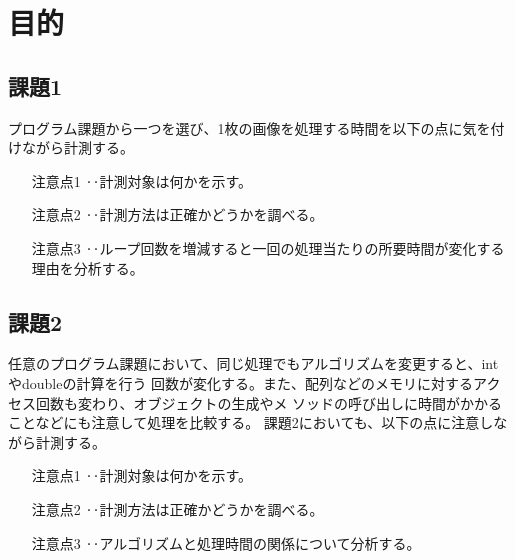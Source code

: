 \section{目的}
\subsection{課題1}
プログラム課題から一つを選び、1枚の画像を処理する時間を以下の点に気を付けながら計測する。
\begin{itemize}
  \setlength{\leftskip}{2.0cm}
  \item[注意点1] ‥計測対象は何かを示す。
  \item[注意点2] ‥計測方法は正確かどうかを調べる。
  \item[注意点3] ‥ループ回数を増減すると一回の処理当たりの所要時間が変化する理由を分析する。
\end{itemize}

\subsection{課題2}
任意のプログラム課題において、同じ処理でもアルゴリズムを変更すると、intやdoubleの計算を行う
回数が変化する。また、配列などのメモリに対するアクセス回数も変わり、オブジェクトの生成やメ
ソッドの呼び出しに時間がかかることなどにも注意して処理を比較する。
課題2においても、以下の点に注意しながら計測する。
\begin{itemize}
  \setlength{\leftskip}{2.0cm}
  \item[注意点1] ‥計測対象は何かを示す。
  \item[注意点2] ‥計測方法は正確かどうかを調べる。
  \item[注意点3] ‥アルゴリズムと処理時間の関係について分析する。
\end{itemize}